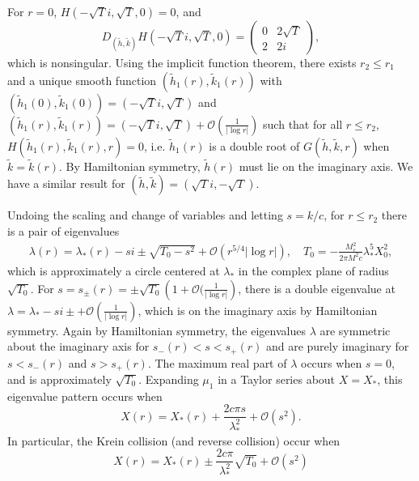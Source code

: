 \documentclass[10pt,reqno]{amsart}
\theoremstyle{plain}
\theoremstyle{definition}
\theoremstyle{remark}
\numberwithin{theorem}{section}
\numberwithin{equation}{section}
\begin{document}
For $r = 0$, $H(-\sqrt{T}i, \sqrt{T}, 0) = 0$, and
\begin{equation*}
D_{(\tilde{h}, \tilde{k})}H(-\sqrt{T}i, \sqrt{T}, 0) = 
\begin{pmatrix}
0 & 2 \sqrt{T} \\
2 & 2i
\end{pmatrix},
\end{equation*}
which is nonsingular. Using the implicit function theorem, there exists $r_2 \leq r_1$ and a unique smooth function $(\tilde{h}_1(r), \tilde{k}_1(r))$ with $(\tilde{h}_1(0), \tilde{k}_1(0)) = (-\sqrt{T}i, \sqrt{T})$ and $(\tilde{h}_1(r), \tilde{k}_1(r)) = (-\sqrt{T}i, \sqrt{T}) + \mathcal{O}(\frac{1}{|\log r|})$ such that for all $r \leq r_2$, $H(\tilde{h}_1(r), \tilde{k}_1(r), r) = 0$, i.e. $\tilde{h}_1(r)$ is a double root of $G(\tilde{h}, \tilde{k}, r)$ when $\tilde{k} = \tilde{k}(r)$. By Hamiltonian symmetry, $\tilde{h}(r)$ must lie on the imaginary axis. We have a similar result for $(\tilde{h}, \tilde{k}) = (\sqrt{T}i, -\sqrt{T})$.

Undoing the scaling and change of variables and letting $s = k/c$, for $r \leq r_2$ there is a pair of eigenvalues
\begin{align*}
\lambda(r) = \lambda_*(r) - s i \pm \sqrt{ T_0 -  s^2} + \mathcal{O}(r^{5/4}|\log r|), \quad T_0 = -\frac{M_c^2}{2 \pi M^2 c } \lambda_*^5 X_0^2,
\end{align*}
which is approximately a circle centered at $\lambda_*$ in the complex plane of radius $\sqrt{T_0}$. For $s = s_\pm(r) = \pm \sqrt{T_0}\left( 1 + \mathcal{O}(\frac{1}{|\log r|} \right)$, there is a double eigenvalue at $\lambda = \lambda_* - s i \pm + \mathcal{O}\left(\frac{1}{|\log r|} \right)$, which is on the imaginary axis by Hamiltonian symmetry. Again by Hamiltonian symmetry, the eigenvalues $\lambda$ are symmetric about the imaginary axis for $s_-(r) < s < s_+(r)$ and are purely imaginary for $s < s_-(r)$ and $s > s_+(r)$. The maximum real part of $\lambda$ occurs when $s = 0$, and is approximately $\sqrt{T_0}$. Expanding $\mu_1$ in a Taylor series about $X = X_*$, this eigenvalue pattern occurs when
\begin{equation}
X(r) = X_*(r) + \frac{2 c \pi s}{\lambda_*^2} + \mathcal{O}(s^2).
\end{equation}
In particular, the Krein collision (and reverse collision) occur when 
\[
X(r) = X_*(r) \pm \frac{2 c \pi}{\lambda_*^2}\sqrt{T_0} + \mathcal{O}(s^2)
\]



\end{document}

